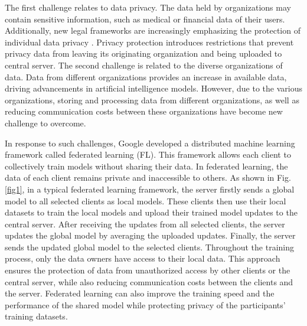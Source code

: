\documentclass[conference]{IEEEtran}
\begin{document}
The first challenge relates to data privacy. 
The data held by organizations may contain sensitive information, 
such as medical or financial data of their users. 
Additionally, new legal frameworks are increasingly 
emphasizing the protection of individual data privacy \cite{b2}. 
Privacy protection introduces restrictions that prevent 
privacy data from leaving its originating organization 
and being uploaded to central server.
The second challenge is related to the diverse organizations of data. 
Data from different organizations provides an increase in available data, 
driving advancements in artificial intelligence models. 
However, due to the various organizations, 
storing and processing data from different organizations, 
as well as reducing communication costs between these organizations 
have become new challenge to overcome.

In response to such challenges, Google \cite{b3} developed a distributed 
machine learning framework called federated learning (FL). 
This framework allows each client 
to collectively train models without sharing their data.
In federated learning, the data of each client remains private and inaccessible 
to others. 
As shown in Fig.\ref{fig1}, in a typical federated learning framework, 
the server firstly sends a global model to all selected clients as local models. 
These clients then use their local datasets to train the 
local models and upload their trained model updates to the central server.
After receiving the updates from all selected clients, 
the server updates the global model by averaging the uploaded updates.
Finally, the server sends the updated global model to the selected clients. 
Throughout the training process, only the data owners 
have access to their local data. 
This approach ensures the protection of data 
from unauthorized access by other clients or the central server, 
while also reducing communication costs between the clients and the server. 
Federated learning can also improve the training speed and the performance of the
shared model while protecting privacy of the participants' training datasets\cite{b4}.
\end{document}
